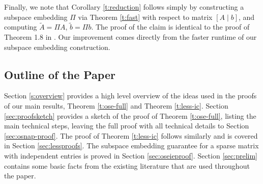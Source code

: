 \documentclass[11pt]{amsart}
\numberwithin{equation}{section}
\numberwithin{equation}{section}
\theoremstyle{remark}
\theoremstyle{definition}
\begin{document}
Finally, we note that Corollary \ref{t:reduction} follows simply by constructing a subspace embedding $\Pi$ via Theorem \ref{t:fast} with respect to matrix $[A\mid b]$, and computing $\tilde A=\Pi A$, $\tilde b = \Pi b$. The proof of the claim is identical to the proof of Theorem 1.8 in \cite{chenakkod2024optimal}. Our improvement comes directly from the faster runtime of our subspace embedding construction.



\subsection{Outline of the Paper}

Section \ref{s:overview} provides a high level overview of the ideas used in the proofs of our main results, Theorem \ref{t:ose-full} and Theorem \ref{t:less-ic}. Section \ref{sec:proofsketch} provides a sketch of the proof of Theorem \ref{t:ose-full}, listing the main technical steps, leaving the full proof with all technical details to Section \ref{sec:osnap-proof}. The proof of Theorem \ref{t:less-ic} follows similarly and is covered in Section \ref{sec:lessproofs}. The subspace embedding guarantee for a sparse matrix with independent entries is proved in Section \ref{sec:oseieproof}. Section \ref{sec:prelim} contains some  basic facts from the existing literature that are used throughout the paper.
\end{document}

